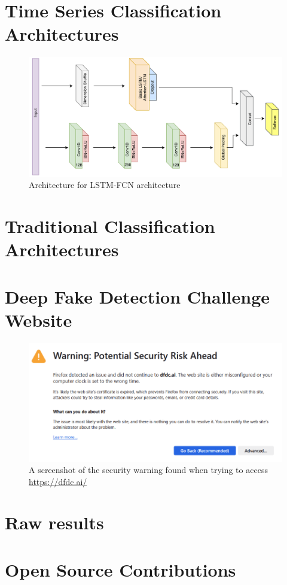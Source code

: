\chapter{Time Series Classification Architectures}
\label{ch:series-architectures}

\begin{figure}[h]
    \centering
    \includegraphics[width=0.75\linewidth]{dissertation//figures/lstm-fcn.png}
    \caption{Architecture for LSTM-FCN architecture\cite{karim2017lstm}}
    \label{fig:lstm-fcn}
\end{figure}

\chapter{Traditional Classification Architectures}
\label{ch:trad-architectures}

\chapter{Deep Fake Detection Challenge Website}
\label{ch:dfdcai}

\begin{figure}
    \centering
    \includegraphics[width=1\linewidth]{dissertation//figures/dfdc.png}
    \caption{A screenshot of the security warning found when trying to access \url{https://dfdc.ai/}}
    \label{fig:dfdcai}
\end{figure}

\chapter{Raw results}
\label{ch:raw-results}

\chapter{Open Source Contributions}